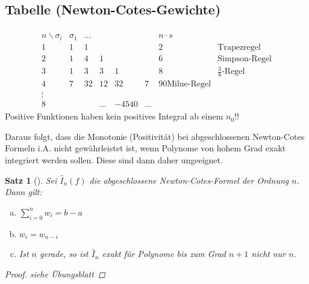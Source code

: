 \documentclass[ngerman,fontsize=11pt, paper=a4, parskip=half, titlepage=true, toc=bib]{scrbook}
\theoremstyle{definition}
\theoremstyle{plain}
\newtheorem{Satz}[Def]{Satz}		%
\newcommand{\subsectione}[1]{\addtocounter{Def}{1}\subsection{#1}}
\newenvironment{Satze}[1][]{ %
  \begin{Satz}[#1]  }
  { \end{Satz}
  \addtocounter{subsection}{1}}
\begin{document}
\subsectione{Tabelle (Newton-Cotes-Gewichte)}
\begin{align*}
  \begin{array}{cccccccl}
    n\backslash \sigma_i &\sigma_1&\dots&&&& n\cdot s\\
    1 & 1&1&&&&2& \text{Trapezregel}\\
    2&1&4&1&&&6 & \text{Simpson-Regel}\\
    3&1&3&3&1&&8& \text{$\frac{3}{8}$-Regel}\\
    4&7&32&12&32&7&90 \text{Milue-Regel}\\
    \vdots\\
    8&&&\dots &-4540&\dots
  \end{array}
\end{align*}
Positive Funktionen haben kein positives Integral ab einem $n_0$!!




Daraus folgt, dass die Monotonie (Positivität) 
bei abgeschlossenen Newton-Cotes Formeln i.A. nicht gewährleistet ist,
wenn Polynome von hohem Grad exakt integriert werden sollen.
Diese sind dann daher ungeeignet.


\begin{Satze}\label{7.2.5}
Sei $\hat{I}_n(f) $ die abgeschlossene Newton-Cotes-Formel
der Ordnung $n$.
Dann gilt:
\begin{enumerate}[a)]
  \item $\sum_{i=0}^nw_i= b-a$
\item $w_i=w_{n-i}$
\item Ist $n$ gerade, so ist $\hat{I}_n$ exakt für Polynome bis zum
  Grad $n+1$ nicht nur $n$.
\end{enumerate}

\begin{proof} siehe Übungsblatt \end{proof}
\end{Satze}
\end{document}
